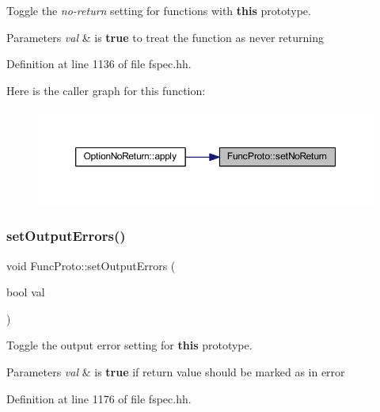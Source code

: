 Toggle the {\itshape no-\/return} setting for functions with {\bfseries{this}} prototype. 


\begin{DoxyParams}{Parameters}
{\em val} & is {\bfseries{true}} to treat the function as never returning \\
\hline
\end{DoxyParams}


Definition at line 1136 of file fspec.\+hh.

Here is the caller graph for this function\+:
\nopagebreak
\begin{figure}[H]
\begin{center}
\leavevmode
\includegraphics[width=350pt]{class_func_proto_aacaf0bda9b424dfd5c6a28d3a45fb100_icgraph}
\end{center}
\end{figure}
\mbox{\label{class_func_proto_ac8eacd70fbc6e4cd5d694d2ae5b1ed64}} 
\subsubsection{\texorpdfstring{setOutputErrors()}{setOutputErrors()}}
{\footnotesize\ttfamily void Func\+Proto\+::set\+Output\+Errors (\begin{DoxyParamCaption}\item[{bool}]{val }\end{DoxyParamCaption})\hspace{0.3cm}{\ttfamily [inline]}}



Toggle the output error setting for {\bfseries{this}} prototype. 


\begin{DoxyParams}{Parameters}
{\em val} & is {\bfseries{true}} if return value should be marked as in error \\
\hline
\end{DoxyParams}


Definition at line 1176 of file fspec.\+hh.

